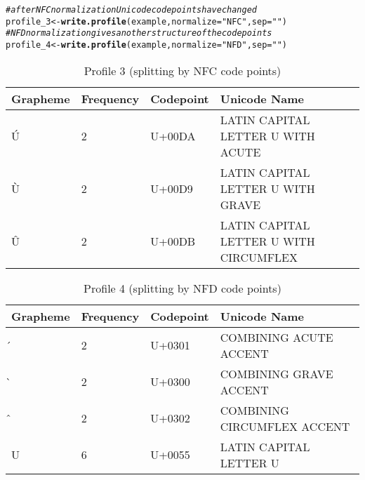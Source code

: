 \documentclass[output=book,nonflat,modfonts,
colorlinks, citecolor=brown,
		]{langsci/langscibook}\usepackage[]{graphicx}\usepackage[]{color}
\makeatletter
\newcommand{\hlstr}[1]{\textcolor[rgb]{0.192,0.494,0.8}{#1}}%
\newcommand{\hlcom}[1]{\textcolor[rgb]{0.678,0.584,0.686}{\textit{#1}}}%
\newcommand{\hlstd}[1]{\textcolor[rgb]{0.345,0.345,0.345}{#1}}%
\newcommand{\hlkwb}[1]{\textcolor[rgb]{0.69,0.353,0.396}{#1}}%
\newcommand{\hlkwc}[1]{\textcolor[rgb]{0.333,0.667,0.333}{#1}}%
\newcommand{\hlkwd}[1]{\textcolor[rgb]{0.737,0.353,0.396}{\textbf{#1}}}%
\newenvironment{kframe}{%
 \def\at@end@of@kframe{}%
 \ifinner\ifhmode%
  \def\at@end@of@kframe{\end{minipage}}%
  \begin{minipage}{\columnwidth}%
 \fi\fi%
 \def\FrameCommand##1{\hskip\@totalleftmargin \hskip-\fboxsep
 \colorbox{shadecolor}{##1}\hskip-\fboxsep
     \hskip-\linewidth \hskip-\@totalleftmargin \hskip\columnwidth}%
 \MakeFramed {\advance\hsize-\width
   \@totalleftmargin\z@ \linewidth\hsize
   \@setminipage}}%
 {\par\unskip\endMakeFramed%
 \at@end@of@kframe}
\newenvironment{knitrout}{}{} %
\makeatother
\begin{document}
\begin{knitrout}\footnotesize
{}\color{fgcolor}\begin{kframe}
\begin{alltt}
\hlcom{# after NFC normalization Unicode code points have changed}
\hlstd{profile_3} \hlkwb{<-} \hlkwd{write.profile}\hlstd{(example,} \hlkwc{normalize} \hlstd{=} \hlstr{"NFC"}\hlstd{,} \hlkwc{sep} \hlstd{=} \hlstr{""}\hlstd{)}
\hlcom{# NFD normalization gives another structure of the code points}
\hlstd{profile_4} \hlkwb{<-} \hlkwd{write.profile}\hlstd{(example,} \hlkwc{normalize} \hlstd{=} \hlstr{"NFD"}\hlstd{,} \hlkwc{sep} \hlstd{=} \hlstr{""}\hlstd{)}
\end{alltt}
\end{kframe}
\end{knitrout}

\begin{table}[H]
\centering
\begingroup\scriptsize
\begin{tabular}{llll}
  \toprule
Grapheme & Frequency & Codepoint & Unicode Name \\ 
  \midrule
Ú & 2 & U+00DA & LATIN CAPITAL LETTER U WITH ACUTE \\ 
  Ù & 2 & U+00D9 & LATIN CAPITAL LETTER U WITH GRAVE \\ 
  Û & 2 & U+00DB & LATIN CAPITAL LETTER U WITH CIRCUMFLEX \\ 
   \bottomrule
\end{tabular}
\endgroup
\caption{Profile 3 (splitting by NFC code points)} 
\label{tab:profile3}
\end{table}


\begin{table}[H]
\centering
\begingroup\scriptsize
\begin{tabular}{llll}
  \toprule
Grapheme & Frequency & Codepoint & Unicode Name \\ 
  \midrule
́ & 2 & U+0301 & COMBINING ACUTE ACCENT \\ 
  ̀ & 2 & U+0300 & COMBINING GRAVE ACCENT \\ 
  ̂ & 2 & U+0302 & COMBINING CIRCUMFLEX ACCENT \\ 
  U & 6 & U+0055 & LATIN CAPITAL LETTER U \\ 
   \bottomrule
\end{tabular}
\endgroup
\caption{Profile 4 (splitting by NFD code points)} 
\label{tab:profile4}
\end{table}
\end{document}
